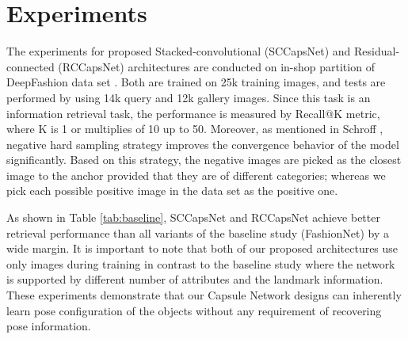 \documentclass[10pt,twocolumn,letterpaper]{article}
\begin{document}
\section{Experiments}

The experiments for proposed Stacked-convolutional (SCCapsNet) and Residual-connected (RCCapsNet) architectures are conducted on in-shop partition of DeepFashion data set \cite{deepfashion}. Both are trained on 25k training images, and tests are performed by using 14k query and 12k gallery images. Since this task is an information retrieval task, the performance is measured by Recall@K metric, where K is 1 or multiplies of 10 up to 50. Moreover, as mentioned in Schroff \etal \cite{facenet}, negative hard sampling strategy improves the convergence behavior of the model significantly. Based on this strategy, the negative images are picked as the closest image to the anchor provided that they are of different categories; whereas we pick each possible positive image in the data set as the positive one.

As shown in Table \ref{tab:baseline}, SCCapsNet and RCCapsNet achieve better retrieval performance than all variants of the baseline study (\ie FashionNet) by a wide margin. It is important to note that both of our proposed architectures use only images during training in contrast to the baseline study where the network is supported by different number of attributes and the landmark information. These experiments demonstrate that our Capsule Network designs can inherently learn pose configuration of the objects without any requirement of recovering pose information.
\end{document}
